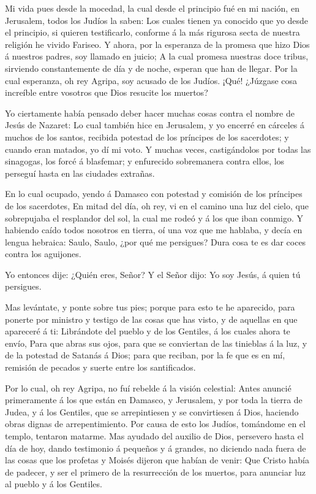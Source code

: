  Mi vida pues desde la mocedad, la cual desde el principio
fué en mi nación, en Jerusalem, todos los Judíos la saben: 
Los cuales tienen ya conocido que yo desde el principio, si quieren
testificarlo, conforme á la más rigurosa secta de nuestra religión he
vivido Fariseo.  Y ahora, por la esperanza de la promesa que
hizo Dios á nuestros padres, soy llamado en juicio;  A la
cual promesa nuestras doce tribus, sirviendo constantemente de día y de
noche, esperan que han de llegar. Por la cual esperanza, oh rey Agripa,
soy acusado de los Judíos.  ¡Qué! ¿Júzgase cosa increíble
entre vosotros que Dios resucite los muertos?

 Yo ciertamente había pensado deber hacer muchas cosas
contra el nombre de Jesús de Nazaret:  Lo cual también hice
en Jerusalem, y yo encerré en cárceles á muchos de los santos, recibida
potestad de los príncipes de los sacerdotes; y cuando eran matados, yo
dí mi voto.  Y muchas veces, castigándolos por todas las
sinagogas, los forcé á blasfemar; y enfurecido sobremanera contra ellos,
los perseguí hasta en las ciudades extrañas.

 En lo cual ocupado, yendo á Damasco con potestad y
comisión de los príncipes de los sacerdotes,  En mitad del
día, oh rey, vi en el camino una luz del cielo, que sobrepujaba el
resplandor del sol, la cual me rodeó y á los que iban conmigo.
 Y habiendo caído todos nosotros en tierra, oí una voz que
me hablaba, y decía en lengua hebraica: Saulo, Saulo, ¿por qué me
persigues? Dura cosa te es dar coces contra los aguijones.

 Yo entonces dije: ¿Quién eres, Señor? Y el Señor dijo: Yo
soy Jesús, á quien tú persigues.

 Mas levántate, y ponte sobre tus pies; porque para esto te
he aparecido, para ponerte por ministro y testigo de las cosas que has
visto, y de aquellas en que apareceré á ti:  Librándote del
pueblo y de los Gentiles, á los cuales ahora te envío, 
Para que abras sus ojos, para que se conviertan de las tinieblas á la
luz, y de la potestad de Satanás á Dios; para que reciban, por la fe que
es en mí, remisión de pecados y suerte entre los santificados.

 Por lo cual, oh rey Agripa, no fuí rebelde á la visión
celestial:  Antes anuncié primeramente á los que están en
Damasco, y Jerusalem, y por toda la tierra de Judea, y á los Gentiles,
que se arrepintiesen y se convirtiesen á Dios, haciendo obras dignas de
arrepentimiento.  Por causa de esto los Judíos, tomándome
en el templo, tentaron matarme.  Mas ayudado del auxilio de
Dios, persevero hasta el día de hoy, dando testimonio á pequeños y á
grandes, no diciendo nada fuera de las cosas que los profetas y Moisés
dijeron que habían de venir:  Que Cristo había de padecer,
y ser el primero de la resurrección de los muertos, para anunciar luz al
pueblo y á los Gentiles.

